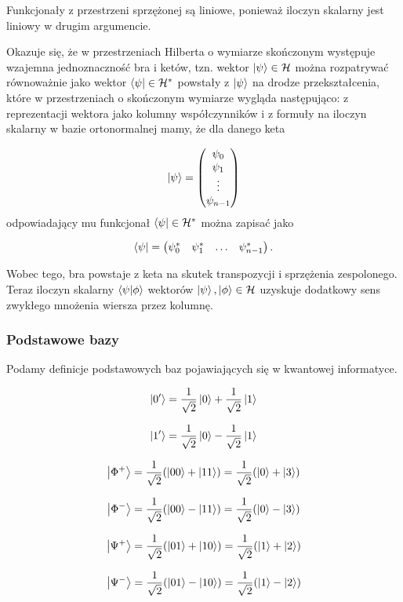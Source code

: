\begin{remark} 
    Funkcjonały z przestrzeni sprzężonej są liniowe, ponieważ iloczyn skalarny jest liniowy w drugim argumencie.
\end{remark}

Okazuje się, że w przestrzeniach Hilberta o wymiarze skończonym występuje wzajemna jednoznaczność bra i ketów, tzn. wektor $\ket{\psi} \in \mathcal{H}$ można rozpatrywać równoważnie jako wektor $\bra{\psi} \in \mathcal{H}^{*}$ powstały z $\ket{\psi}$ na drodze przekształcenia, które w przestrzeniach o skończonym wymiarze wygląda następująco: z reprezentacji wektora jako kolumny współczynników i z formuły na iloczyn skalarny w bazie ortonormalnej mamy, że dla danego keta

$$
    \ket{\psi} =
    \begin{pmatrix}
        \psi_{0} \\
        \psi_{1} \\
        \vdots \\
        \psi_{n - 1} \\
    \end{pmatrix}
$$
odpowiadający mu funkcjonał $\bra{\psi} \in \mathcal{H}^{*}$ można zapisać jako

$$
    \bra{\psi} = \begin{pmatrix} \psi_{0}^{*} & \psi_{1}^{*} & \ldots & \psi_{n - 1}^{*} \end{pmatrix}.
$$

Wobec tego, bra powstaje z keta na skutek transpozycji i sprzężenia zespolonego. Teraz iloczyn skalarny $\bra{\psi}\ket{\phi}$ wektorów $\ket{\psi}, \ket{\phi} \in \mathcal{H}$ uzyskuje dodatkowy sens zwykłego mnożenia wiersza przez kolumnę.

\subsubsection{Podstawowe bazy}

Podamy definicje podstawowych baz pojawiających się w kwantowej informatyce.

\begin{definition}
    $$
        \ket{0'} = \frac{1}{\sqrt{2}} \ket{0} + \frac{1}{\sqrt{2}} \ket{1}
    $$

    $$
        \ket{1'} = \frac{1}{\sqrt{2}} \ket{0} - \frac{1}{\sqrt{2}} \ket{1}
    $$
\end{definition}

\begin{definition}
    $$
        \ket{\Phi ^ {+}} = \frac{1}{\sqrt{2}} (\ket{00} + \ket{11}) = \frac{1}{\sqrt{2}} (\ket{0} + \ket{3})
    $$

    $$
        \ket{\Phi ^ {-}} = \frac{1}{\sqrt{2}} (\ket{00} - \ket{11}) = \frac{1}{\sqrt{2}} (\ket{0} - \ket{3})
    $$

    $$
        \ket{\Psi ^ {+}} = \frac{1}{\sqrt{2}} (\ket{01} + \ket{10}) = \frac{1}{\sqrt{2}} (\ket{1} + \ket{2})
    $$

    $$
        \ket{\Psi ^ {-}} = \frac{1}{\sqrt{2}} (\ket{01} - \ket{10}) = \frac{1}{\sqrt{2}} (\ket{1} - \ket{2})
    $$
\end{definition}


